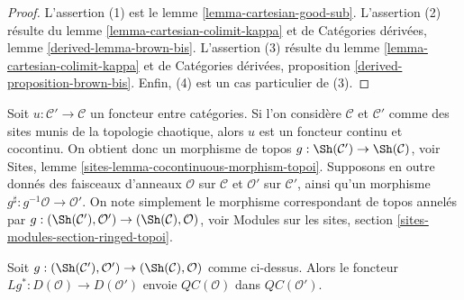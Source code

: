 \begin{proof}
L'assertion (1) est le lemme \ref{lemma-cartesian-good-sub}. L'assertion (2)
résulte du lemme \ref{lemma-cartesian-colimit-kappa} et de Catégories dérivées,
lemme \ref{derived-lemma-brown-bis}. L'assertion (3) résulte du lemme
\ref{lemma-cartesian-colimit-kappa} et de Catégories dérivées, proposition
\ref{derived-proposition-brown-bis}. Enfin, (4) est un cas particulier de
(3).
\end{proof}

\noindent
Soit $u : \mathcal{C}' \to \mathcal{C}$ un foncteur entre catégories. Si
l'on considère $\mathcal{C}$ et $\mathcal{C}'$ comme des sites munis de la
topologie chaotique, alors $u$ est un foncteur continu et cocontinu. On obtient
donc un morphisme de topos
$g : \Sh(\mathcal{C}') \to \Sh(\mathcal{C})$, voir Sites, lemme
\ref{sites-lemma-cocontinuous-morphism-topoi}. Supposons en outre donnés des
faisceaux d'anneaux $\mathcal{O}$ sur $\mathcal{C}$ et $\mathcal{O}'$ sur
$\mathcal{C}'$, ainsi qu'un morphisme
$g^\sharp : g^{-1}\mathcal{O} \to \mathcal{O}'$. On note simplement le
morphisme correspondant de topos annelés par
$g : (\Sh(\mathcal{C}'), \mathcal{O}') \to (\Sh(\mathcal{C}), \mathcal{O})$,
voir Modules sur les sites, section \ref{sites-modules-section-ringed-topoi}.

\begin{lemma}
\label{lemma-cartesian-functorial}
Soit
$g : (\Sh(\mathcal{C}'), \mathcal{O}') \to (\Sh(\mathcal{C}), \mathcal{O})$
comme ci-dessus. Alors le foncteur
$Lg^* : D(\mathcal{O}) \to D(\mathcal{O}')$ envoie
$\mathit{QC}(\mathcal{O})$ dans $\mathit{QC}(\mathcal{O}')$.
\end{lemma}

